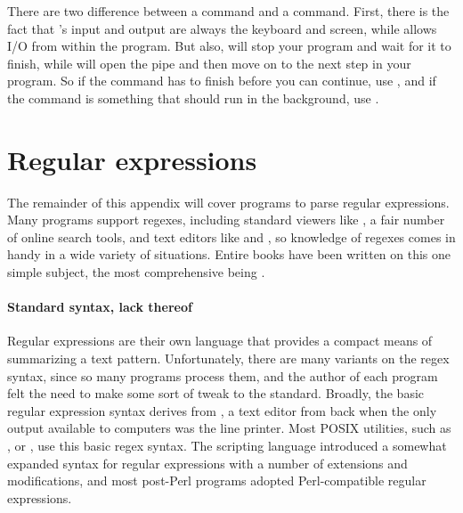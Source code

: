 There are two difference between a  command and a  command.
First, there is the fact that 's input and output are always
the keyboard and screen, while  allows I/O from within the program.
But also,  will stop your program and wait for it to finish,
while  will open the pipe and then move on to the next step in
your program. So if the command has to finish before you can continue,
use , and if the command is something that should run in the
background, use .


\section{Regular expressions}
The remainder of this appendix will cover programs to parse regular
expressions.  Many programs support regexes, including standard viewers
like , a fair number of online search tools, and text editors
like  and , so knowledge of regexes comes in handy
in a wide variety of situations. Entire books have been written on this
one simple subject, the most comprehensive being \citet{friedl:regex}.

\paragraph{Standard syntax, lack thereof} Regular expressions are
their own language that provides a compact means of summarizing a text
pattern. Unfortunately, there are many variants on the regex syntax,
since so many programs process them, and the author of each program felt
the need to make some sort of tweak to the standard.  Broadly, the basic
regular expression syntax derives from , a text editor from back
when the only output available to computers was the line printer. Most
POSIX utilities, such as ,  or ,
use this basic regex syntax. The scripting language 
introduced a somewhat expanded syntax for regular expressions with
a number of extensions and modifications, and most post-Perl programs
adopted Perl-compatible regular expressions.

